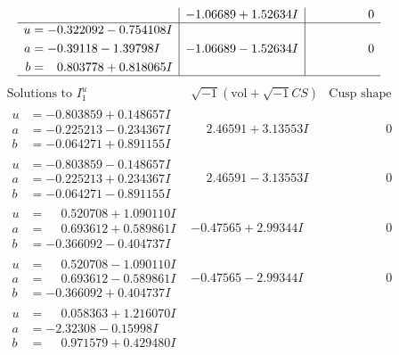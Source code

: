 \documentclass[1p]{elsarticle_modified}
\theoremstyle{definition}
\newcommand{\I}{\sqrt{-1}}
\begin{document}
$$\begin{array}{c|c|c}
 & -1.06689 + 1.52634 I & \phantom{-0.000000 } 0 \\ \hline\begin{aligned}
u &= -0.322092 - 0.754108 I \\
a &= -0.39118 - 1.39798 I \\
b &= \phantom{-}0.803778 + 0.818065 I\end{aligned}
 & -1.06689 - 1.52634 I & \phantom{-0.000000 } 0\\
 \hline 
 \end{array}$$\newpage$$\begin{array}{c|c|c}  
\text{Solutions to }I^u_{1}& \I (\text{vol} + \sqrt{-1}CS) & \text{Cusp shape}\\
 \hline 
\begin{aligned}
u &= -0.803859 + 0.148657 I \\
a &= -0.225213 - 0.234367 I \\
b &= -0.064271 + 0.891155 I\end{aligned}
 & \phantom{-}2.46591 + 3.13553 I & \phantom{-0.000000 } 0 \\ \hline\begin{aligned}
u &= -0.803859 - 0.148657 I \\
a &= -0.225213 + 0.234367 I \\
b &= -0.064271 - 0.891155 I\end{aligned}
 & \phantom{-}2.46591 - 3.13553 I & \phantom{-0.000000 } 0 \\ \hline\begin{aligned}
u &= \phantom{-}0.520708 + 1.090110 I \\
a &= \phantom{-}0.693612 + 0.589861 I \\
b &= -0.366092 - 0.404737 I\end{aligned}
 & -0.47565 + 2.99344 I & \phantom{-0.000000 } 0 \\ \hline\begin{aligned}
u &= \phantom{-}0.520708 - 1.090110 I \\
a &= \phantom{-}0.693612 - 0.589861 I \\
b &= -0.366092 + 0.404737 I\end{aligned}
 & -0.47565 - 2.99344 I & \phantom{-0.000000 } 0 \\ \hline\begin{aligned}
u &= \phantom{-}0.058363 + 1.216070 I \\
a &= -2.32308 - 0.15998 I \\
b &= \phantom{-}0.971579 + 0.429480 I\end{aligned}

\end{array}$$
\end{document}
